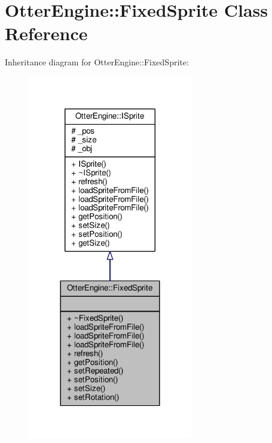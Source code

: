 \hypertarget{class_otter_engine_1_1_fixed_sprite}{}\section{Otter\+Engine\+:\+:Fixed\+Sprite Class Reference}
\label{class_otter_engine_1_1_fixed_sprite}


Inheritance diagram for Otter\+Engine\+:\+:Fixed\+Sprite\+:\nopagebreak
\begin{figure}[H]
\begin{center}
\leavevmode
\includegraphics[width=204pt]{de/d21/class_otter_engine_1_1_fixed_sprite__inherit__graph}
\end{center}
\end{figure}


